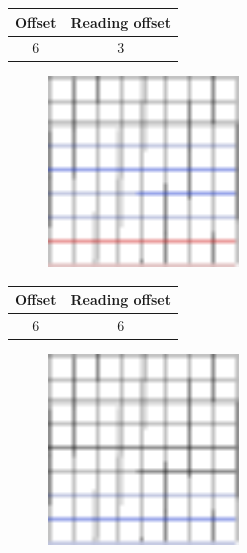 \documentclass{beamer}
\begin{document}
\begin{frame}{}
    \begin{table}
        \centering
        \begin{tabular}{|c|c|}
            \hline
            Offset & Reading offset \\
            \hline
            6 & 3 \\
            \hline
        \end{tabular}
    \end{table}
    \begin{figure}
        \centering
        \includegraphics[width=0.45\textwidth]{grid_3r_3_ro_2.pdf}
        \label{fig:grid_3r_3_ro_2}
    \end{figure}
\end{frame}

\begin{frame}{}
    \begin{table}
        \centering
        \begin{tabular}{|c|c|}
            \hline
            Offset & Reading offset \\
            \hline
            6 & 6 \\
            \hline
        \end{tabular}
    \end{table}
    \begin{figure}
        \centering
        \includegraphics[width=0.45\textwidth]{grid_3r_3_ro_3.pdf}
        \label{fig:grid_3r_3_ro_3}
    \end{figure}
\end{frame}
\end{document}
